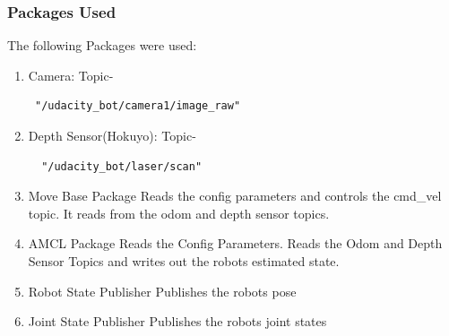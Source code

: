 \documentclass[10pt,journal,compsoc]{IEEEtran}
\begin{document}
\subsubsection{Packages Used}
The following Packages were used:
\begin{enumerate}[i]
\item Camera: Topic- \begin{verbatim} "/udacity_bot/camera1/image_raw" 
\end{verbatim} 
\item Depth Sensor(Hokuyo): Topic-  \begin{verbatim}  "/udacity_bot/laser/scan" 
\end{verbatim}
\item Move Base Package Reads the config parameters and controls the cmd\_vel topic. It reads from the odom and depth sensor topics. 
\item AMCL Package Reads the Config Parameters. Reads the Odom and Depth Sensor Topics and writes out the robots estimated state.
\item Robot State Publisher Publishes the robots pose
\item Joint State Publisher Publishes the robots joint states
\end{enumerate}

\end{document}
